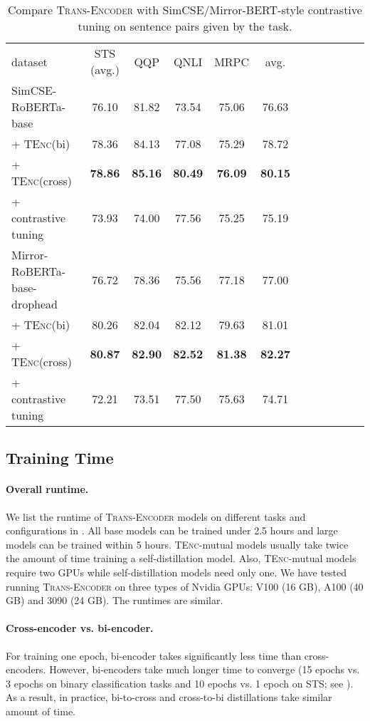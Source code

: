 \documentclass{article} \usepackage{iclr2021_conference,times}
\newcommand{\modelname}{\textsc{Trans-Encoder}\xspace}
\newcommand{\tenc}{\textsc{TEnc}\xspace}
\begin{document}
\begin{table}[!t] \centering
\small
\begin{tabular}{lccccccccccc}
\cmidrule[1.5pt]{1-10}
dataset  & STS (avg.) & QQP & QNLI & MRPC & avg.\\
\cmidrule[1.5pt]{1-10}
 SimCSE-RoBERTa-base & 76.10 & 81.82 & 73.54 & 75.06 & 76.63 \\
 + \tenc (bi) & 78.36 & 84.13 & 77.08 & 75.29 & 78.72  \\
 + \tenc (cross) & \textbf{78.86} & \textbf{85.16} & \textbf{80.49} & \textbf{76.09} &  \textbf{80.15} \\
 \hdashline
 + contrastive tuning & 73.93 & 74.00 & 77.56 & 75.25 &  75.19 \\
\cmidrule[1.0pt]{1-10}
 Mirror-RoBERTa-base-drophead & 76.72 & 78.36 & 75.56 & 77.18 & 77.00 \\
 + \tenc (bi) & 80.26 & 82.04 & 82.12 & 79.63 & 81.01 \\
 + \tenc (cross) & \textbf{80.87} & \textbf{82.90} & \textbf{82.52} & \textbf{81.38} & \textbf{82.27} \\
 \hdashline
  + contrastive tuning & 72.21 & 73.51 & 77.50 & 75.63 & 74.71 \\
\cmidrule[1.5pt]{1-10}
\end{tabular}
\caption{Compare \modelname with SimCSE/Mirror-BERT-style contrastive tuning on sentence pairs given by the task.}
\label{tab:label_leak}
\end{table}

\subsection{Training Time}
\paragraph{Overall runtime.} We list the runtime of \modelname models on different tasks and configurations in . All base models can be trained under 2.5 hours and large models can be trained within 5 hours. \tenc-mutual models usually take twice the amount of time training a self-distillation model. Also, \tenc-mutual models require two GPUs while self-distillation models need only one. We have tested running \modelname on three types of Nvidia GPUs: V100 (16 GB), A100 (40 GB) and 3090 (24 GB). The runtimes are similar. 

\paragraph{Cross-encoder vs. bi-encoder.} For training one epoch, bi-encoder takes significantly less time than cross-encoders. However, bi-encoders take much longer time to converge (15 epochs vs. 3 epochs on binary classification tasks and 10 epochs vs. 1 epoch on STS; see ). As a result, in practice, bi-to-cross and cross-to-bi distillations take similar amount of time.
\end{document}
